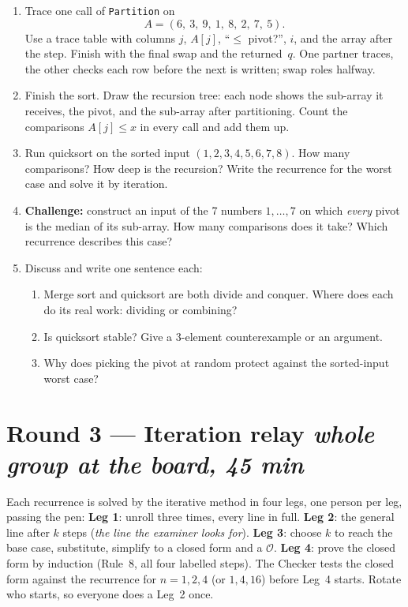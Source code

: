 \documentclass{fkt-notes}
\newcommand{\Oh}{\mathcal{O}}
\begin{document}
\begin{enumerate}[label=\textbf{2.\arabic*},leftmargin=2.5em]
  \item Trace one call of \texttt{Partition} on
  \[A=(6,\ 3,\ 9,\ 1,\ 8,\ 2,\ 7,\ 5).\]
  Use a trace table with columns $j$, $A[j]$, ``$\le$ pivot?'', $i$, and the array after the step. Finish with the final swap and the returned~$q$. One partner traces, the other checks each row before the next is written; swap roles halfway.
  \item Finish the sort. Draw the recursion tree: each node shows the sub-array it receives, the pivot, and the sub-array after partitioning. Count the comparisons $A[j]\le x$ in every call and add them up.
  \item Run quicksort on the sorted input $(1,2,3,4,5,6,7,8)$. How many comparisons? How deep is the recursion? Write the recurrence for the worst case and solve it by iteration.
  \item \textbf{Challenge:} construct an input of the 7 numbers $1,\dots,7$ on which \emph{every} pivot is the median of its sub-array. How many comparisons does it take? Which recurrence describes this case?
  \item Discuss and write one sentence each:
    \begin{enumerate}[label=(\alph*)]
      \item Merge sort and quicksort are both divide and conquer. Where does each do its real work: dividing or combining?
      \item Is quicksort stable? Give a 3-element counterexample or an argument.
      \item Why does picking the pivot at random protect against the sorted-input worst case?
    \end{enumerate}
\end{enumerate}

\section*{Round 3 --- Iteration relay \hfill\normalsize\emph{whole group at the board, 45 min}}

Each recurrence is solved by the iterative method in four legs, one person per leg, passing the pen:
\textbf{Leg 1}: unroll three times, every line in full.
\textbf{Leg 2}: the general line after $k$ steps (\emph{the line the examiner looks for}).
\textbf{Leg 3}: choose $k$ to reach the base case, substitute, simplify to a closed form and a $\Oh$.
\textbf{Leg 4}: prove the closed form by induction (Rule~8, all four labelled steps).
The Checker tests the closed form against the recurrence for $n=1,2,4$ (or $1,4,16$) before Leg~4 starts. Rotate who starts, so everyone does a Leg~2 once.
\end{document}
